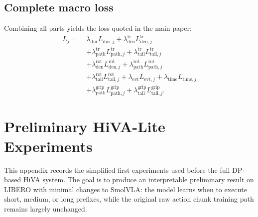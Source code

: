 \documentclass[10pt,twocolumn,letterpaper]{article}
\begin{document}
\subsection{Complete macro loss}
Combining all parts yields the loss quoted in the main paper:
\begin{align}
L_j =\;& \lambda_{\mathrm{dur}}L_{\mathrm{dur},j}
+ \lambda_{\mathrm{den}}^{\mathrm{tr}}L_{\mathrm{den},j}^{\mathrm{tr}} \nonumber\\
&+ \lambda_{\mathrm{path}}^{\mathrm{tr}}L_{\mathrm{path},j}^{\mathrm{tr}}
+ \lambda_{\mathrm{tail}}^{\mathrm{tr}}L_{\mathrm{tail},j}^{\mathrm{tr}} \nonumber\\
&+ \lambda_{\mathrm{den}}^{\mathrm{rot}}L_{\mathrm{den},j}^{\mathrm{rot}}
+ \lambda_{\mathrm{path}}^{\mathrm{rot}}L_{\mathrm{path},j}^{\mathrm{rot}} \nonumber\\
&+ \lambda_{\mathrm{tail}}^{\mathrm{rot}}L_{\mathrm{tail},j}^{\mathrm{rot}}
+ \lambda_{\mathrm{evt}}L_{\mathrm{evt},j}
+ \lambda_{\mathrm{time}}L_{\mathrm{time},j} \nonumber\\
&+ \lambda_{\mathrm{path}}^{\mathrm{grip}}L_{\mathrm{path},j}^{\mathrm{grip}}
+ \lambda_{\mathrm{tail}}^{\mathrm{grip}}L_{\mathrm{tail},j}^{\mathrm{grip}}.
\end{align}


\section{Preliminary HiVA-Lite Experiments}
\label{app:prelim-hiva-lite}
This appendix records the simplified first experiments used before the full DP-based HiVA system. The goal is to produce an interpretable preliminary result on LIBERO with minimal changes to SmolVLA: the model learns when to execute short, medium, or long prefixes, while the original raw action chunk training path remains largely unchanged.
\end{document}
